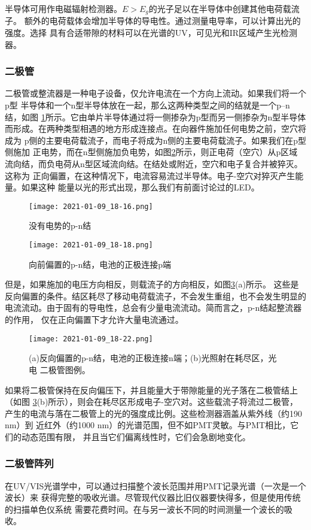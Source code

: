 半导体可用作电磁辐射检测器。$ E> E_g$的光子足以在半导体中创建其他电荷载流子。
额外的电荷载体会增加半导体的导电性。通过测量电导率，可以计算出光的强度。选择
具有合适带隙的材料可以在光谱的UV，可见光和IR区域产生光检测器。
\subsubsection{二极管}
二极管或整流器是一种电子设备，仅允许电流在一个方向上流动。如果我们将一个p型
半导体和一个n型半导体放在一起，那么这两种类型之间的结就是一个p–n结，如图
\ref{fig:5.21}所示。它由单片半导体通过将一侧掺杂为p型而另一侧掺杂为n型半导体
而形成。在两种类型相遇的地方形成连接点。在向器件施加任何电势之前，空穴将成为
p侧的主要电荷载流子，而电子将成为n侧的主要电荷载流子。如果我们在p型侧施加
正电势，而在n型侧施加负电势，如图\ref{fig:5.22}所示，则正电荷（空穴）从p区域
流向结，而负电荷从n型区域流向结。在结处或附近，空穴和电子复合并被猝灭。这称为
正向偏置，在这种情况下，电流容易流过半导体。电子-空穴对猝灭产生能量。如果这种
能量以光的形式出现，那么我们有前面讨论过的LED。
\begin{figure}[htpb]
    \centering
    \texttt{[image: 2021-01-09\_18-16.png]}
    \caption{没有电势的p-n结}
    \label{fig:5.21}
\end{figure}
\begin{figure}[htpb]
    \centering
    \texttt{[image: 2021-01-09\_18-18.png]}
    \caption{向前偏置的p-n结，电池的正极连接p端}
    \label{fig:5.22}
\end{figure}

但是，如果施加的电压方向相反，则载流子的方向相反，如图\ref{fig:5.23}(a)所示。
这些是反向偏置的条件。结区耗尽了移动电荷载流子，不会发生重组，也不会发生明显的
电流流动。由于固有的导电性，总会有少量电流流动。简而言之，p-n结起整流器的作用，
仅在正向偏置下才允许大量电流通过。
\begin{figure}[htpb]
    \centering
    \texttt{[image: 2021-01-09\_18-22.png]}
    \caption{(a)反向偏置的p-n结，电池的正极连接n端；(b)光照射在耗尽区，光电
    二极管图例。}
    \label{fig:5.23}
\end{figure}

如果将二极管保持在反向偏压下，并且能量大于带隙能量的光子落在二极管结上（如图
\ref{fig:5.23}(b)所示），则会在耗尽区形成电子-空穴对。这些载流子将流过二极管，
产生的电流与落在二极管上的光的强度成比例。这些检测器涵盖从紫外线（约190 nm）到
近红外（约1000 nm）的光谱范围，但不如PMT灵敏。与PMT相比，它们的动态范围有限，
并且当它们偏离线性时，它们会急剧地变化。
\subsubsection{二极管阵列}
在UV/VIS光谱学中，可以通过扫描整个波长范围并用PMT记录光谱（一次是一个波长）来
获得完整的吸收光谱。尽管现代仪器比旧仪器要快得多，但是使用传统的扫描单色仪系统
需要花费时间。在与另一波长不同的时间测量一个波长的吸收。

